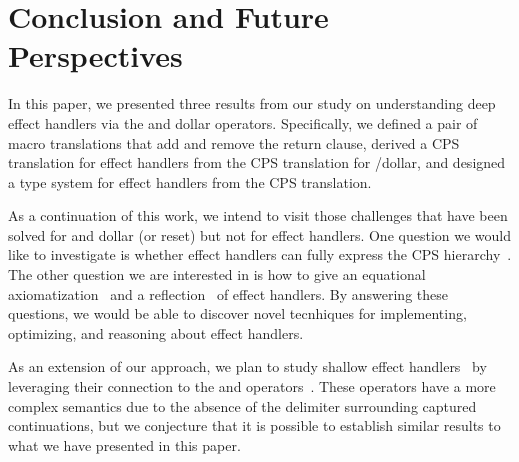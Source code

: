 \section{Conclusion and Future Perspectives}
\label{sec:conclusion}

In this paper, we presented three results from our study on understanding
deep effect handlers via the \shiftztt and dollar operators.
Specifically, we defined a pair of macro translations that add and remove
the return clause, derived a CPS translation for effect handlers from the
CPS translation for \shiftztt/dollar, and designed a type system for effect
handlers from the CPS translation.

As a continuation of this work, we intend to visit those challenges that
have been solved for \shiftztt and dollar (or reset) but not for effect
handlers.
One question we would like to investigate is whether effect handlers can 
fully express the CPS hierarchy~\cite{danvy-abstracting}.
The other question we are interested in is how to give an equational 
axiomatization~\cite{materzok-axiom} and a reflection~\cite{biernacki-stack}
of effect handlers.
By answering these questions, we would be able to discover novel 
tecnhiques for implementing, optimizing, and reasoning about effect 
handlers.

As an extension of our approach, we plan to study shallow effect
handlers~\cite{hillerstrom-shallow} by leveraging their connection to
the \controlztt and \promptztt operators~\cite{pirog-typedeq}.
These operators have a more complex semantics due to the absence of the
delimiter surrounding captured continuations, but we conjecture that it
is possible to establish similar results to what we have presented in this
paper.
